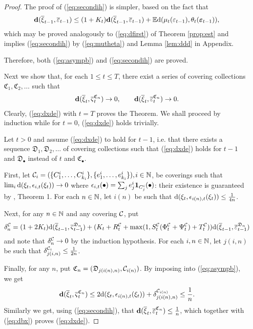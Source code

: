 \documentclass{article}              %
\begin{document}
\begin{proof}
The proof of (\ref{eq:secondih}) is simpler, based on the fact that
\[
\mathbf{d}(\overline{\xi}_{t-1},\overline{\varepsilon}_{t-1})\leq(1+K_{t})\mathbf{d}(\overline{\xi}_{t-1},\overline{\varepsilon}_{t-1})+\mathbb{E}\mathrm{d}(\mu_{t}(\varepsilon_{t-1}),\theta_{t}(\boldsymbol{\varepsilon}_{t-1})),
\]
which may be proved analogously to (\ref{eq:dfirst}) of Theorem \ref{prop:est} and
implies (\ref{eq:secondih}) by (\ref{eq:mutheta}) and Lemma
\ref{lem:ddd} in Appendix.

Therefore, both (\ref{eq:asympb}) and (\ref{eq:secondih}) are proved.

Next we show that, for each $1\leq t\leq T$, there exist a series
of covering collections $\mathfrak{C}_{1},\mathfrak{C}_{2},\dots$
such that 
\begin{equation}
\mathbf{d}(\overline{\xi}_{t},\overline{\varsigma}_{t}^{\mathfrak{C}_{n}})\rightarrow0,\qquad \mathbf{d}(\overline{\xi}_{t},\overline{\varepsilon}_{t}^{\mathfrak{C}_{n}})\rightarrow0.\label{eq:dxde}
\end{equation}
 Clearly, (\ref{eq:dxde}) with $t=T$ proves the Theorem. We shall proceed by induction while  for $t=0$, (\ref{eq:dxde}) holds trivially. 

Let $t>0$ and assume (\ref{eq:dxde}) to hold for $t-1$, i.e. that there
exists a sequence $\mathfrak{D}_{1},\mathfrak{D}_{2},\dots$ of covering
collections such that (\ref{eq:dxde}) holds for $t-1$ and $\mathfrak{D_{\bullet}}$ instead of
$t$ and $\mathfrak{C_{\bullet}}$. 


First, let $\mathcal{C}_{i}=(\{C_{1}^{i},\dots,C_{k_{i}}^{i}\},\{e_{1}^{i},\dots,e_{k_{i}}^{i}\}),$$i\in\mathbb{N}$,
be coverings such that $\lim_{i}\mathrm{d}(\xi_{t},\epsilon_{i,t}(\xi_{t}))\rightarrow0$
where $\epsilon_{i,t}(\bullet)=\sum_{j}e_{j}^{i}\mathbf{1}_{C_{j}^{i}}(\bullet)$: their existence is guaranteed by \cite{Smid09c}, Theorem 1. For
each $n\in\mathbb{N}$, let $i(n)$ be such that $\mathrm{d}(\xi_{t},\epsilon_{i(n),t}(\xi_{t}))\leq\frac{1}{4n}$.

Next, for any $n\in \mathbb{N}$ and any covering $\mathcal{C}$, put 
\begin{equation}
\delta_{n}^{\mathcal{C}}=(1+2K_{t})\mathrm{d}(\overline{\xi}_{t-1},\overline{\varsigma}_{t-1}^{\mathfrak{D}_{n}})
+(K_{t}+R_{t}^{\mathcal{C}}+\max(1,S_{t}^{\mathcal{C}}(\Phi_{t}^{\mathcal{C}}+\Psi_{t}^{\mathcal{C}})+T_{t}^{\mathcal{C}}))\mathrm{d}(\overline{\xi}_{t-1},\overline{\varepsilon}_{t-1}^{\mathfrak{D}_{n}})\label{eq:deltac}
\end{equation}
and note that $\delta_{n}^{\mathcal{C}}\rightarrow0$ by the induction hypothesis. 
For each $i,n\in\mathbb{N}$, let $j(i,n)$ be such that $\delta_{j(i,n)}^{\mathcal{C}_{i}}\leq\frac{1}{2n}$.

Finally, for any $n$, put $\mathfrak{C}_{n}=(\mathfrak{D}_{j(i(n),n)},\mathcal{C}_{i(n)})$.
By imposing into (\ref{eq:asympb}), we get 
\begin{equation}
\mathbf{d}(\overline{\xi}_{t},\overline{\varsigma}_{t}^{\mathfrak{C}_{n}})\leq2\mathrm{d}(\xi_{t},\epsilon_{i(n),t}(\xi_{t}))+\delta_{j(i(n),n)}^{\mathcal{C}_{i(n)}}\leq\frac{1}{n}.
\label{eq:dbx}
\end{equation}
Similarly we get, using (\ref{eq:secondih}), that $\mathbf{d}(\overline{\xi}_{t},\overline{\varepsilon}_{t}^{\mathfrak{C}_{n}})\leq\frac{1}{n}$,
which together with (\ref{eq:dbx}) proves (\ref{eq:dxde}).
\end{proof}
\end{document}
